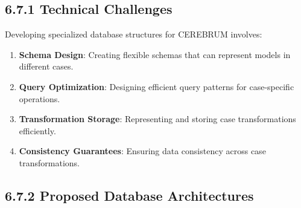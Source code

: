 \documentclass[
  11pt,
  letterpaper,
]{article}
\providecommand{\tightlist}{%
  \setlength{\itemsep}{0pt}\setlength{\parskip}{0pt}}
\begin{document}
\hypertarget{technical-challenges-4}{%
\subsection{6.7.1 Technical Challenges}\label{technical-challenges-4}}

Developing specialized database structures for CEREBRUM involves:

\begin{enumerate}
\def\labelenumi{\arabic{enumi}.}
\tightlist
\item
  \textbf{Schema Design}: Creating flexible schemas that can represent
  models in different cases.
\item
  \textbf{Query Optimization}: Designing efficient query patterns for
  case-specific operations.
\item
  \textbf{Transformation Storage}: Representing and storing case
  transformations efficiently.
\item
  \textbf{Consistency Guarantees}: Ensuring data consistency across case
  transformations.
\end{enumerate}

\hypertarget{proposed-database-architectures}{%
\subsection{6.7.2 Proposed Database
Architectures}\label{proposed-database-architectures}}
\end{document}
